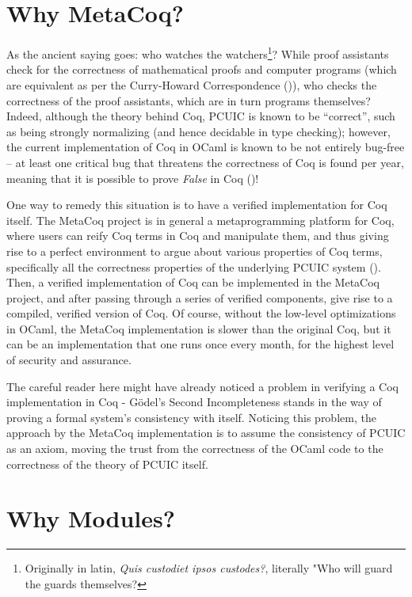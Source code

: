 \section{Why MetaCoq?}

As the ancient saying goes: who watches the watchers\footnote{Originally in
latin, \emph{Quis custodiet ipsos custodes?}, literally "Who will guard the
guards themselves?}? While proof assistants check for the correctness of
mathematical proofs and computer programs (which are equivalent as per the
Curry-Howard Correspondence (\cite{howard1980formulae,curry1934functionality})),
who checks the correctness of the proof assistants, which are in turn programs
themselves? Indeed, although the theory behind Coq, PCUIC is known to be
``correct'', such as being strongly normalizing (and hence decidable in type
checking); however, the current implementation of Coq in OCaml is known to be
not entirely bug-free -- at least one critical bug that threatens the
correctness of Coq is found per year, meaning that it is possible to prove
\emph{False} in Coq (\cite{coq_consistency})!

One way to remedy this situation is to have a verified implementation for Coq
itself. The MetaCoq project is in general a metaprogramming platform for Coq,
where users can reify Coq terms in Coq and manipulate them, and thus giving rise
to a perfect environment to argue about various properties of Coq terms,
specifically all the correctness properties of the underlying PCUIC
system (\cite{sozeau2020metacoq}). Then, a verified implementation of Coq can be
implemented in the MetaCoq project, and after passing through a series of
verified components, give rise to a compiled, verified version of Coq. Of
course, without the low-level optimizations in OCaml, the MetaCoq implementation
is slower than the original Coq, but it can be an implementation that one runs
once every month, for the highest level of security and assurance.

The careful reader here might have already noticed a problem in verifying a Coq
implementation in Coq - Gödel's Second Incompleteness stands in the way of
proving a formal system's consistency with itself. Noticing this problem, the
approach by the MetaCoq implementation is to assume the consistency of PCUIC as
an axiom, moving the trust from the correctness of the OCaml code to the
correctness of the theory of PCUIC itself.

\section{Why Modules?}


